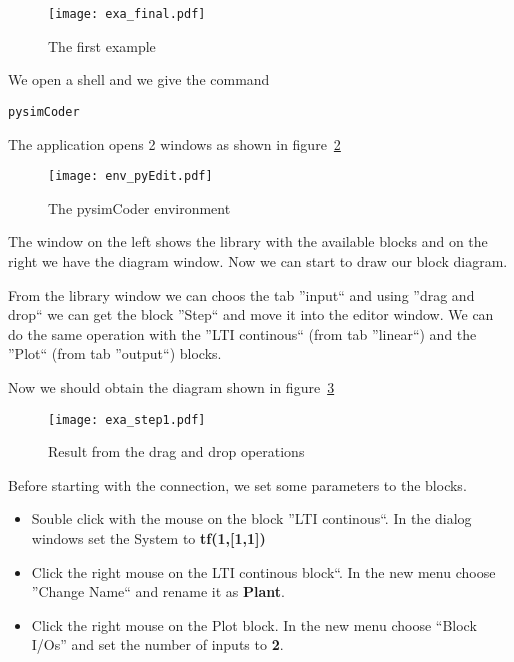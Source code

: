\begin{figure}[htbp]	%
\centering
\texttt{[image: exa\_final.pdf]}
\caption{The first example}
\label{Fig:exa1}
\end{figure}

We open a shell and we give the command
 
\begin{verbatim}
pysimCoder
\end{verbatim}

The application opens 2 windows as shown in figure~\ref{Fig:envEdit}

\begin{figure}[htbp]	%
\centering
\texttt{[image: env\_pyEdit.pdf]}
\caption{The pysimCoder environment}
\label{Fig:envEdit}
\end{figure}

The window on the left shows the library with the available blocks and on the 
right we have the diagram window. Now we can start to draw our block diagram.

From the library window we can choos the tab ''input`` and using ''drag and 
drop`` we can get the block ''Step`` and move it into the editor window. We can 
do the same operation with the ''LTI continous`` (from tab ''linear``) and the 
''Plot`` (from tab ''output``) blocks.

Now we should obtain the diagram shown in figure~\ref{Fig:exa_step1}

\begin{figure}[htbp]	%
\centering
\texttt{[image: exa\_step1.pdf]}
\caption{Result from the drag and drop operations}
\label{Fig:exa_step1}
\end{figure}

Before starting with the connection, we set some parameters to the blocks.

\begin{itemize}
\item Souble click with the mouse on the block ''LTI continous``. In the dialog 
windows set the System to \textbf{tf(1,[1,1])}
\item Click the right mouse on the LTI continous block``. In the new menu 
choose ''Change Name`` and rename it as \textbf{Plant}.
\item Click the right mouse on the Plot block. In the new menu choose ``Block 
I/Os'' and set the number of inputs to \textbf{2}.
\end{itemize}

